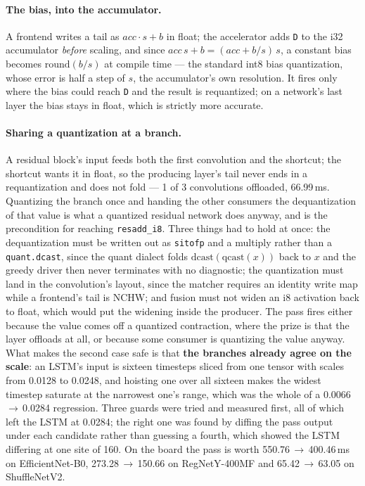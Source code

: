 \documentclass[runningheads]{llncs}
\begin{document}
\paragraph{The bias, into the accumulator.} A frontend writes a tail as
$\mathit{acc}\cdot s + b$ in float; the accelerator adds \texttt{D} to the i32
accumulator \emph{before} scaling, and since
$\mathit{acc}\,s + b = (\mathit{acc} + b/s)\,s$, a constant bias becomes
$\mathrm{round}(b/s)$ at compile time --- the standard int8 bias quantization,
whose error is half a step of $s$, the accumulator's own resolution. It fires only
where the bias could reach \texttt{D} and the result is requantized; on a network's
last layer the bias stays in float, which is strictly more accurate.

\paragraph{Sharing a quantization at a branch.} A residual block's input feeds both
the first convolution and the shortcut; the shortcut wants it in float, so the
producing layer's tail never ends in a requantization and does not fold --- 1 of 3
convolutions offloaded, 66.99\,ms. Quantizing the branch once and handing the other
consumers the dequantization of that value is what a quantized residual network
does anyway, and is the precondition for reaching \texttt{resadd\_i8}. Three things had to hold at once: the
dequantization must be written out as \texttt{sitofp} and a multiply rather than a
\texttt{quant.dcast}, since the quant dialect folds
$\mathrm{dcast}(\mathrm{qcast}(x))$ back to $x$ and the greedy driver then never
terminates with no diagnostic; the quantization must land in the convolution's
layout, since the matcher requires an identity write map while a frontend's tail is
NCHW; and fusion must not widen an i8 activation back to float, which would put the
widening inside the producer. The pass fires
either because the value comes off a quantized contraction, where the prize is that
the layer offloads at all, or because some consumer is quantizing the value anyway.
What makes the second case safe is that \textbf{the branches already agree on the
scale}: an LSTM's input is sixteen timesteps sliced from one tensor with scales
from 0.0128 to 0.0248, and hoisting one over all sixteen makes the widest timestep
saturate at the narrowest one's range, which was the whole of a
0.0066\,$\to$\,0.0284 regression. Three guards were tried and measured first, all of which left the LSTM at
0.0284; the right one was found by diffing the pass output under each candidate
rather than guessing a fourth, which showed the LSTM differing at one site of
160. On the board the pass is worth
550.76\,$\to$\,400.46\,ms on EfficientNet-B0, 273.28\,$\to$\,150.66 on
RegNetY-400MF and 65.42\,$\to$\,63.05 on ShuffleNetV2.
\end{document}
